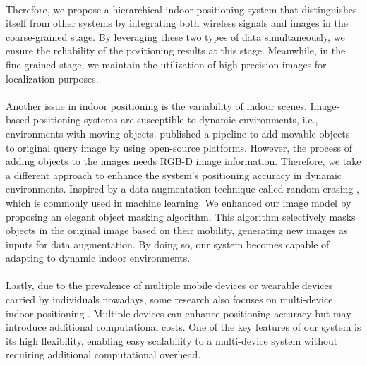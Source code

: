 \documentclass[a4paper,12pt]{report}
\begin{document}
\paragraph{}
Therefore, we propose a hierarchical indoor positioning system that distinguishes itself from other systems by integrating both wireless signals and images in the coarse-grained stage. By leveraging these two types of data simultaneously, we ensure the reliability of the positioning results at this stage. Meanwhile, in the fine-grained stage, we maintain the utilization of high-precision images for localization purposes.
\paragraph{}
Another issue in indoor positioning is the variability of indoor scenes. Image-based positioning systems are susceptible to dynamic environments, i.e., environments with moving objects. \cite{dubenova2022d} published a pipeline to add movable objects to original query image by using open-source platforms. However, the process of adding objects to the images needs RGB-D image information. Therefore, we take a different approach to enhance the system's positioning accuracy in dynamic environments. Inspired by a data augmentation technique called random erasing \cite{shorten2019survey}, which is commonly used in machine learning. We enhanced our image model by proposing an elegant object masking algorithm. This algorithm selectively masks objects in the original image based on their mobility, generating new images as inputs for data augmentation. By doing so, our system becomes capable of adapting to dynamic indoor environments.
\paragraph{}
Lastly, due to the prevalence of multiple mobile devices or wearable devices carried by individuals nowadays, some research also focuses on multi-device indoor positioning \cite{Lin2021, Wu2022}. Multiple devices can enhance positioning accuracy but may introduce additional computational costs. One of the key features of our system is its high flexibility, enabling easy scalability to a multi-device system without requiring additional computational overhead.
\end{document}
